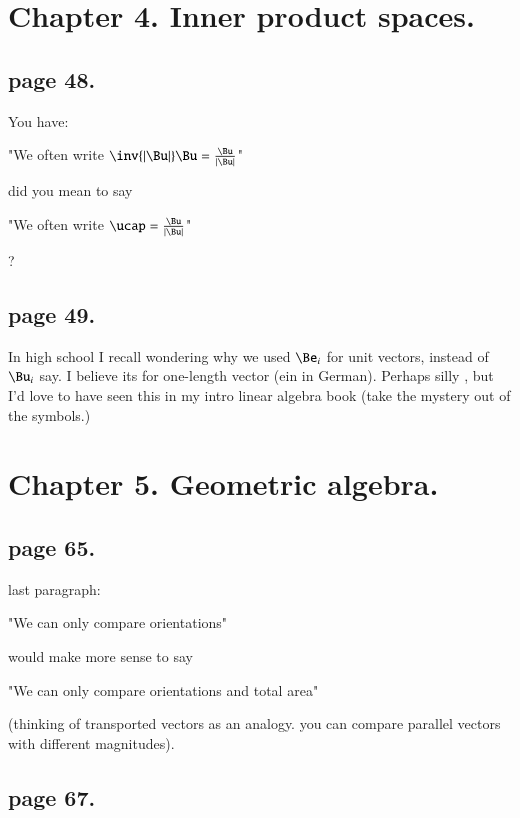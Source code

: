 \documentclass{article}
\author{Peeter Joot \quad peeter.joot@gmail.com}
\begin{document}

\section{Chapter 4. Inner product spaces. }

\subsection{page 48. }  

You have:

"We often write $\inv{\Abs{\Bu}}\Bu = \frac{\Bu}{\Abs{\Bu}}$"

did you mean to say

"We often write $\ucap = \frac{\Bu}{\Abs{\Bu}}$"

?

\subsection{page 49. }

In high school I recall wondering why we used $\Be_i$ for unit vectors, instead of $\Bu_i$ say.
I 
believe its for one-length vector (ein in German).  Perhaps silly
, but I'd love to have seen this in my intro linear algebra book (take the mystery out of the symbols.)

\section{Chapter 5.  Geometric algebra. } 

\subsection{page 65. }

last paragraph:

  "We can only compare orientations"

would make more sense to say

  "We can only compare orientations and total area"

(thinking of transported vectors as an analogy.  you can compare parallel vectors with different magnitudes).

\subsection{page 67. }
\end{document}
